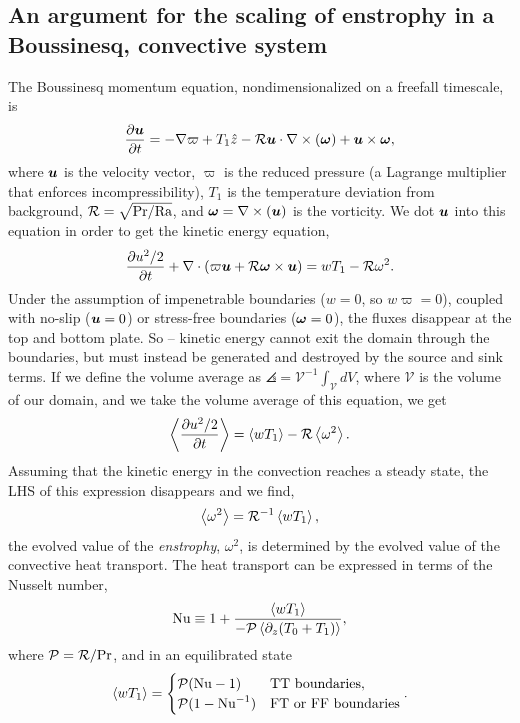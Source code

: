 \subsection{An argument for the scaling of enstrophy in a Boussinesq, convective system}
\label{sec:enstrophy_scaling}
The Boussinesq momentum equation, nondimensionalized on a freefall timescale, is
\begin{equation}
\frac{\partial \bm{u}}{\partial t} = -\nabla\varpi + T_1\hat{z} - \mathcal{R} \bm{u} \cdot \nabla \times \left(\bm{\omega}\right) + \bm{u} \times \bm{\omega},
\label{eqn:momentum}
\end{equation}
where $\bm{u}$ is the velocity vector, $\varpi$ is the reduced pressure (a Lagrange multiplier that enforces incompressibility), $T_1$ is the temperature deviation from background, $\mathcal{R} = \sqrt{\text{Pr}/\text{Ra}}$, and $\bm{\omega} = \nabla \times \left(\bm{u}\right)$ is the vorticity.
We dot $\bm{u}$ into this equation in order to get the kinetic energy equation,
\begin{equation}
\frac{\partial u^2/2}{\partial t} + \nabla\cdot\left( \varpi \bm{u} + \mathcal{R} \bm{\omega} \times \bm{u}\right) = w T_1 - \mathcal{R} \omega^2.
\end{equation}
Under the assumption of impenetrable boundaries ($w = 0$, so $w\varpi = 0$), coupled with no-slip ($\bm{u} = 0$) or stress-free boundaries ($\bm{\omega} = 0$), the fluxes disappear at the top and bottom plate.
So -- kinetic energy cannot exit the domain through the boundaries, but must instead be generated and destroyed by the source and sink terms.
If we define the volume average as $\angles{} = \mathcal{V}^{-1}\int_{\mathcal{V}} dV$, where $\mathcal{V}$ is the volume of our domain, and we take the volume average of this equation, we get
\begin{equation}
\left\langle \frac{\partial u^2/2}{\partial t} \right\rangle = \left\langle w T_1 \right\rangle - \mathcal{R} \left\langle \omega^2 \right\rangle.
\end{equation}
Assuming that the kinetic energy in the convection reaches a steady state, the LHS of this expression disappears and we find,
\begin{equation}
\left\langle \omega^2 \right\rangle = \mathcal{R}^{-1} \left\langle w T_1 \right\rangle,
\end{equation}
the evolved value of the \emph{enstrophy}, $\omega^2$, is determined by the evolved value of the convective heat transport.
The heat transport can be expressed in terms of the Nusselt number, 
\begin{equation}
\text{Nu} \equiv 1 + \frac{\left\langle w T_1 \right\rangle}{-\mathcal{P} \left\langle \partial_z (T_0 + T_1) \right\rangle},
\end{equation}
where $\mathcal{P} = \mathcal{R}/\text{Pr}$, and in an equilibrated state
\begin{equation}
\left\langle w T_1 \right\rangle = 
\begin{cases}
\mathcal{P} (\text{Nu} - 1)  & \text{TT boundaries}, \\
\mathcal{P} (1 - \text{Nu}^{-1}) & \text{FT or FF boundaries}
\end{cases}.
\end{equation}
